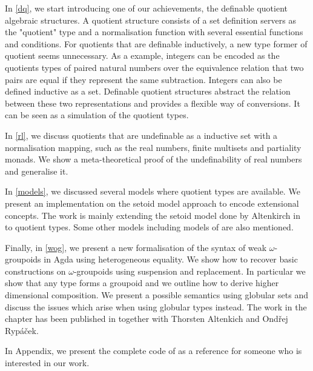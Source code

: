 In \autoref{dq}, we start introducing one of our achievements, the
definable quotient algebraic structures. A quotient structure consists of a set definition servers as the "quotient" type and a normalisation function with several essential functions and conditions.
For quotients that are definable inductively, a new type former of quotient seems unnecessary.
As a example, integers can be encoded as the
quotients types of paired natural numbers over the equivalence
relation that two pairs are equal if they represent the same
subtraction. Integers can also be defined inductive as a set. Definable quotient structures abstract the relation between these two representations and provides a flexible way of conversions. It can be seen as 
a simulation of the quotient types.



In \autoref{rl}, we discuss quotients that are undefinable as a inductive set with a normalisation mapping, such as the real numbers, finite multisets and partiality monads. We show a meta-theoretical proof of the undefinability of real numbers and generalise it.


In \autoref{models}, we discussed several models where quotient types are available. We present an implementation on the setoid model approach to encode
extensional concepts. The work is mainly extending the setoid model
done by Altenkirch in \cite{alti:lics99} to
quotient types. Some other models including models of \hott are also mentioned.






Finally, in \autoref{wog}, we present a new formalisation of the syntax of weak
  $\omega$-groupoids in Agda using heterogeneous equality. We show how
  to recover basic constructions on $\omega$-groupoids using
  suspension and replacement. In particular we show that any type
  forms a groupoid and we outline how to derive higher dimensional
  composition. We present a possible semantics using globular sets and
  discuss the issues which arise when using globular types instead. The work in the chapter has been published in \cite{LFMTP14} together with Thorsten Altenkich and Ond\v{r}ej Ryp\'{a}\v{c}ek.


In Appendix, we present the complete code of as a reference for someone who is interested in our work.
